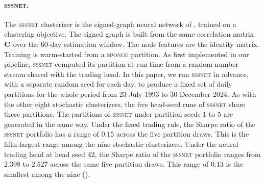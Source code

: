 \paragraph{\textsc{sssnet}.} The \textsc{sssnet} clusterizer is the signed-graph neural
network of \citet{he2022sssnet}, trained on a clustering objective. The signed graph is
built from the same correlation matrix $\mathbf{C}$ over the 60-day estimation window. The node features are the identity matrix. Training is warm-started from a \textsc{sponge}
partition. As first implemented in our pipeline, \textsc{sssnet} computed its partition at run time from a random-number stream shared with the trading head.\label{app:sssnet} In this paper, we run \textsc{sssnet} in advance, with a separate random seed for each day, to produce a fixed set of daily partitions for the whole period from 23 July 1993 to 30 December 2024. As with the other eight stochastic clusterizers, the five head-seed runs of \textsc{sssnet} share these partitions. The partitions of \textsc{sssnet} under partition seeds $1$ to $5$ are generated in the same way. Under the fixed trading rule, the Sharpe ratio of the \textsc{sssnet} portfolio has a range of $0.15$ across the five partition draws. This is the fifth-largest range among the nine stochastic clusterizers. Under the neural trading head at head seed $42$, the Sharpe ratio of the \textsc{sssnet} portfolio ranges from $2.398$ to $2.527$ across the same five partition draws. This range of $0.13$ is the smallest among the nine ().


